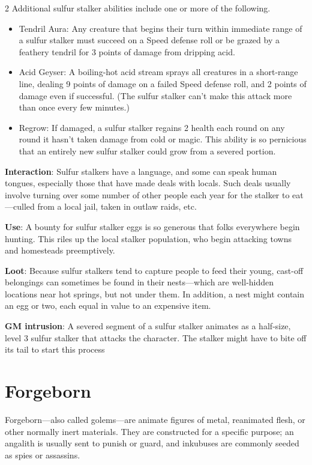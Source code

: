 \begin{multicols}{2}
Additional sulfur stalker abilities include one or more of the following.
\begin{itemize}
\item Tendril Aura: Any creature that begins their turn within immediate range of a sulfur stalker must succeed on a Speed defense roll or be grazed by a feathery tendril for 3 points of damage from dripping acid. 
\item Acid Geyser: A boiling-hot acid stream sprays all creatures in a short-range line, dealing 9 points of damage on a failed Speed defense roll, and 2 points of damage even if successful. (The sulfur stalker can’t make this attack more than once every few minutes.) 
\item Regrow: If damaged, a sulfur stalker regains 2 health each round on any round it hasn’t taken damage from cold or magic. This ability is so pernicious that an entirely new sulfur stalker could grow from a severed portion.
\end{itemize}

\textbf{Interaction}: Sulfur stalkers have a language, and some can speak human tongues, especially those that have made deals with locals. Such deals usually involve turning over some number of other people each year for the stalker to eat—culled from a local jail, taken in outlaw raids, etc. 

\textbf{Use}: A bounty for sulfur stalker eggs is so generous that folks everywhere begin hunting. This riles up the local stalker population, who begin attacking towns and homesteads preemptively. 

\textbf{Loot}: Because sulfur stalkers tend to capture people to feed their young, cast-off belongings can sometimes be found in their nests—which are well-hidden locations near hot springs, but not under them. In addition, a nest might contain an egg or two, each equal in value to an expensive item.

\textbf{GM intrusion}: A severed segment of a sulfur stalker animates as a half‑size, level 3 sulfur stalker that attacks the character. The stalker might have to bite off its tail to start this process

\section{Forgeborn}

Forgeborn—also called golems—are animate figures of metal, reanimated flesh, or other normally inert materials. They are constructed for a specific purpose; an angalith is usually
sent to punish or guard, and inkubuses are commonly seeded as spies or assassins.


\end{multicols}
